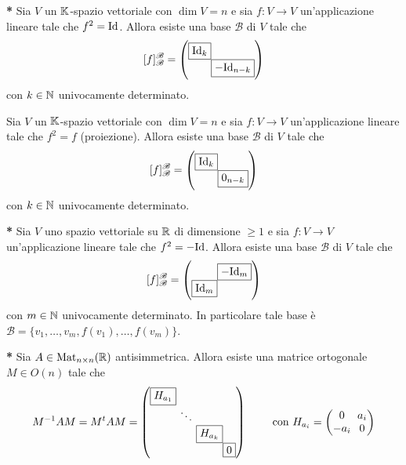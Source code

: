 
\begin{thm} \textbf{*}
	Sia $ V $ un $ \mathbb{K} $-spazio vettoriale con $ \dim{V} = n $ e sia $ f \colon V \to V $ un'applicazione lineare tale che $ f^{2} = \mathrm{Id} $. Allora esiste una base $ \mathscr{B} $ di $ V $ tale che 
	\[[f]_{\mathscr{B}}^{\mathscr{B}} = 
	\setlength{\arraycolsep}{0pt}
	\begin{pmatrix}
	\fbox{$ \Id_k $} & \\
	& \fbox{$ -\Id_{n - k} $}
	\end{pmatrix}\]
	con $ k \in \mathbb{N} $ univocamente determinato.
\end{thm}

\begin{thm}
	Sia $ V $ un $ \mathbb{K} $-spazio vettoriale con $ \dim{V} = n $ e sia $ f \colon V \to V $ un'applicazione lineare tale che $ f^{2} = f $ (proiezione). Allora esiste una base $ \mathscr{B} $ di $ V $ tale che 
	\[[f]_{\mathscr{B}}^{\mathscr{B}} = 
	\setlength{\arraycolsep}{0pt}
	\begin{pmatrix}
	\fbox{$ \Id_k $} & \\
	& \fbox{$ 0_{n - k} $}
	\end{pmatrix}\]
	con $ k \in \mathbb{N} $ univocamente determinato.
\end{thm}

\begin{thm} \textbf{*}
	Sia $ V $ uno spazio vettoriale su $ \mathbb{R} $ di dimensione $ \geq 1 $ e sia $ f \colon V \to V $ un'applicazione lineare tale che $ f^{2} = - \mathrm{Id} $. Allora esiste una base $ \mathscr{B} $ di $ V $ tale che 
	\[[f]_{\mathscr{B}}^{\mathscr{B}} = 
	\setlength{\arraycolsep}{0pt}
	\begin{pmatrix}
	& \fbox{$ -\Id_m $}\\
	\fbox{$ \Id_m $} & 
	\end{pmatrix}\]
	con $ m \in \mathbb{N} $ univocamente determinato. In particolare tale base è $ \mathscr{B} = \{v_1, \ldots, v_m, f(v_1), \ldots, f(v_m)\} $.
\end{thm}

\begin{thm} \textbf{*}
	Sia $ A \in \mathrm{Mat}_{n \times n}(\mathbb{R}) $ antisimmetrica. Allora esiste una matrice ortogonale $ M \in O(n) $ tale che 
	\[M^{-1} A M = M^{t} A M = 
	\setlength{\arraycolsep}{0pt}
	\begin{pmatrix}
	\fbox{$ H_{a_1} $} & & &\\
	& \ \ddots \ & & \\
	& & \fbox{$ H_{a_k} $} & \\
	& & & \fbox{$ 0 $}
	\end{pmatrix}
	\qquad
	\text{ con }
	H_{a_i} = 
	\setlength{\arraycolsep}{3pt}
	\begin{pmatrix}
	0 & a_{i} \\
	-a_{i} & 0
	\end{pmatrix}\]
\end{thm}
